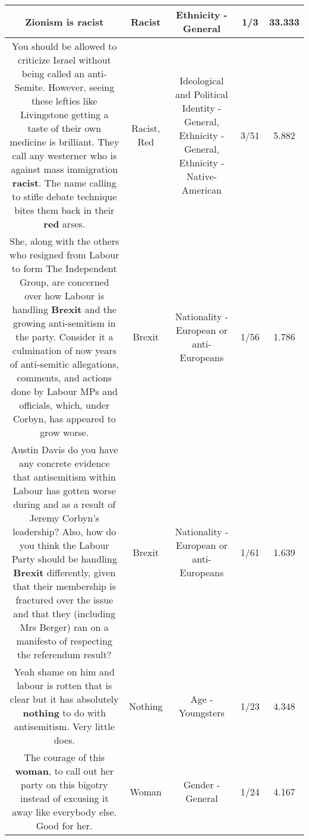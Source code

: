 \documentclass[11pt]{article}
\newlength\mylength
\begin{document}
\begin{center}
\begin{longtable}{|C{.65\mylength}|C{.30\mylength}|C{.12\mylength}|C{.12\mylength}|C{.12\mylength}|}
  \small Zionism is racist\normalsize   & Racist & Ethnicity - General & 1/3 & 33.333 \\  \hline
  \small You should be allowed to criticize Israel without being called an anti-Semite. However, seeing these lefties like Livingstone getting a taste of their own medicine is brilliant. They call any westerner who is against mass immigration \textbf{racist}. The name calling to stifle debate technique bites them back in their \textbf{r\textbf{ed}} arses.\normalsize   & Racist, Red &  Ideological and Political Identity - General, Ethnicity - General, Ethnicity - Native-American & 3/51 & 5.882 \\  \hline
  \small She, along with the others who resigned from Labour to form The Independent Group, are concerned over how Labour is handling \textbf{Brexit} and the growing anti-semitism in the party. Consider it a culmination of now years of anti-semitic allegations, comments, and actions done by Labour MPs and officials, which, under Corbyn, has appeared to grow worse.\normalsize   & Brexit & Nationality - European or anti-Europeans & 1/56 & 1.786 \\  \hline
  \small Austin Davis do you have any concrete evidence that antisemitism within Labour has gotten worse during and as a result of Jeremy Corbyn's leadership? Also, how do you think the Labour Party should be handling \textbf{Brexit} differently, given that their membership is fractured over the issue and that they  (including Mrs Berger) ran on a manifesto of respecting the referendum result?\normalsize   & Brexit & Nationality - European or anti-Europeans & 1/61 & 1.639 \\  \hline
  \small Yeah shame on him and labour is rotten that is clear but it has absolutely \textbf{nothing} to do with antisemitism. Very little does.\normalsize   & Nothing & Age - Youngsters & 1/23 & 4.348 \\  \hline
  \small The courage of this \textbf{woman}, to call out her party on this bigotry instead of excusing it away like everybody else.  Good for her.\normalsize   & Woman & Gender - General & 1/24 & 4.167 \\  \hline

\end{longtable}
\end{center}
\end{document}
